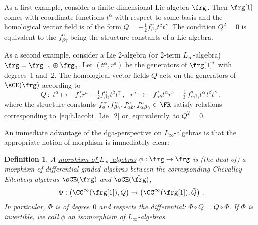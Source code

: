 \documentclass[reqno,a4paper,11pt]{article}
\newtheorem{definition}[thm]{Definition}
\begin{document}
As a first  example, consider a finite-dimensional Lie algebra $\frg$. Then $\frg[1]$ comes with coordinate functions $t^\alpha$ with respect to some basis and the homological vector field is of the form $Q=-\tfrac12 f^\alpha_{\beta\gamma} t^\beta t^\gamma$. The condition $Q^2=0$ is equivalent to the $f^\alpha_{\beta\gamma}$ being the structure constants of a Lie algebra.

As a second example, consider a Lie 2-algebra (or 2-term $L_\infty$-algebra) $\frg=\frg_{-1}\oplus \frg_0$. Let $(t^\alpha,r^a)$ be the generators of $\frg[1]^*$ with degrees~1 and~2. The homological vector fields $Q$ acts on the generators of $\sCE(\frg)$ according to
\begin{equation}\label{eq:CE_Lie_2_algebra}
 Q~:~t^\alpha\mapsto -f^\alpha_a r^a-\tfrac12 f^\alpha_{\beta\gamma}t^\beta t^\gamma~,~~~r^a\mapsto-f^a_{\alpha b}t^\alpha r^b-\tfrac{1}{3!}f^a_{\alpha\beta\gamma}t^\alpha t^\beta t^\gamma~,
\end{equation}
where the structure constants $f^\alpha_a, f^\alpha_{\beta\gamma}, f^a_{\alpha b}, f^a_{\alpha\beta\gamma}\in \FR$ satisfy relations corresponding to~\eqref{eq:hJacobi_Lie_2} or, equivalently, to $Q^2=0$.

An immediate advantage of the dga-perspective on $L_\infty$-algebras is that the appropriate notion of morphism is immediately clear:
\begin{definition}
A \underline{morphism of $L_\infty$-algebras} $\phi:\frg\rightarrow \tilde \frg$ is (the dual of) a morphism of differential graded algebras between the corresponding Chevalley--Eilenberg algebras $\sCE(\frg)$ and $\sCE(\tilde \frg)$, 
\begin{equation}
 \Phi:\big(\CC^\infty(\frg[1]),Q\big)\rightarrow \big(\CC^\infty(\tilde \frg[1]),\tilde Q\big)~.
\end{equation}
In particular, $\Phi$ is of degree~$0$ and respects the differential: $\Phi \circ Q = \tilde Q \circ \Phi$. If $\Phi$ is invertible, we call $\phi$ an \uline{isomorphism of $L_\infty$-algebras}.
\end{definition}
\end{document}
